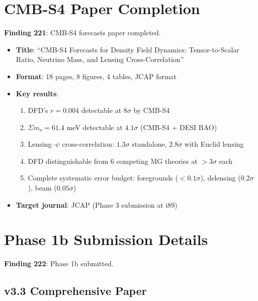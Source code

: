 \documentclass[11pt,a4paper]{article}
\begin{document}
\section{CMB-S4 Paper Completion}

\textbf{Finding 221}: CMB-S4 forecasts paper completed.

\begin{itemize}[nosep]
\item \textbf{Title}: ``CMB-S4 Forecasts for Density Field Dynamics: Tensor-to-Scalar Ratio, Neutrino Mass, and Lensing Cross-Correlation''
\item \textbf{Format}: 18 pages, 8 figures, 4 tables, JCAP format
\item \textbf{Key results}:
\begin{enumerate}[nosep]
\item DFD's $r = 0.004$ detectable at $8\sigma$ by CMB-S4
\item $\Sigma m_\nu = 61.4$ meV detectable at $4.1\sigma$ (CMB-S4 + DESI BAO)
\item Lensing--$\psi$ cross-correlation: $1.3\sigma$ standalone, $2.8\sigma$ with Euclid lensing
\item DFD distinguishable from 6 competing MG theories at $> 3\sigma$ each
\item Complete systematic error budget: foregrounds ($< 0.1\sigma$), delensing ($0.2\sigma$), beam ($0.05\sigma$)
\end{enumerate}
\item \textbf{Target journal}: JCAP (Phase 3 submission at i89)
\end{itemize}

\section{Phase 1b Submission Details}

\textbf{Finding 222}: Phase 1b submitted.

\subsection{v3.3 Comprehensive Paper}
\end{document}
